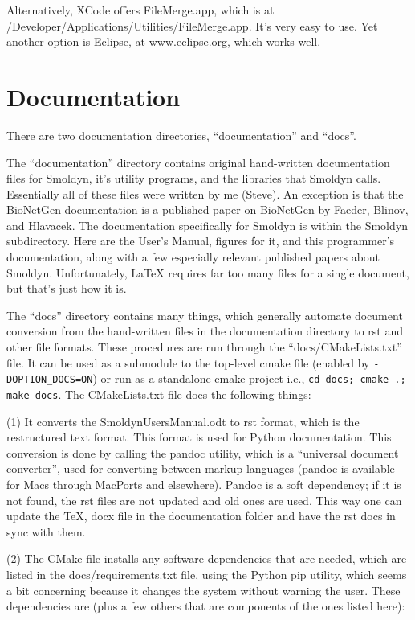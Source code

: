 \documentclass {scrbook}
\newcommand {\ttt} {\texttt}
\begin{document}
Alternatively, XCode offers FileMerge.app, which is at /Developer/Applications/Utilities/FileMerge.app. It's very easy to use. Yet another option is Eclipse, at \url{www.eclipse.org}, which works well.

\section{Documentation}

There are two documentation directories, ``documentation'' and ``docs''.

The ``documentation'' directory contains original hand-written documentation files for Smoldyn, it's utility programs, and the libraries that Smoldyn calls. Essentially all of these files were written by me (Steve). An exception is that the BioNetGen documentation is a published paper on BioNetGen by Faeder, Blinov, and Hlavacek. The documentation specifically for Smoldyn is within the Smoldyn subdirectory. Here are the User's Manual, figures for it, and this programmer's documentation, along with a few especially relevant published papers about Smoldyn. Unfortunately, LaTeX requires far too many files for a single document, but that's just how it is.

The ``docs'' directory contains many things, which generally automate document conversion from the hand-written files in the documentation directory to rst and other file formats. These procedures are run through the ``docs/CMakeLists.txt'' file. It can be used as a submodule to the top-level cmake file (enabled by \ttt{-DOPTION\_DOCS=ON}) or run as a standalone cmake project i.e., \ttt{cd docs; cmake .; make docs}. The CMakeLists.txt file does the following things:

(1) It converts the SmoldynUsersManual.odt to rst format, which is the restructured text format. This format is used for Python documentation. This conversion is done by calling the pandoc utility, which is a ``universal document converter'', used for converting between markup languages (pandoc is available for Macs through MacPorts and elsewhere). Pandoc is a soft dependency; if it is not found, the rst files are not updated and old ones are used. This way one can update the TeX, docx file in the documentation folder and have the rst docs in sync with them.

(2) The CMake file installs any software dependencies that are needed, which are listed in the docs/requirements.txt file, using the Python pip utility, which seems a bit concerning because it changes the system without warning the user. These dependencies are (plus a few others that are components of the ones listed here):
\end{document}
